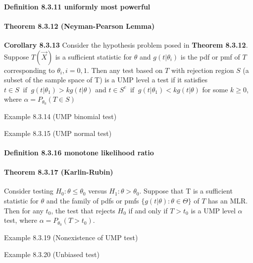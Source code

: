 \documentclass[6pt,twocolumn,Portrait]{article}
\let\oldparagraph\paragraph
\renewcommand{\paragraph}[1]{\oldparagraph{#1}\mbox{}}
\begin{document}
\hypertarget{UMP}{%
\paragraph{\texorpdfstring{\textbf{Definition 8.3.11 uniformly most
powerful}}{Definition 8.3.11 uniformly most powerful}}\label{UMP}}

\hypertarget{Neym-Pear}{%
\paragraph{\texorpdfstring{\textbf{Theorem 8.3.12 (Neyman-Pearson
Lemma)}}{Theorem 8.3.12 (Neyman-Pearson Lemma)}}\label{Neym-Pear}}

\textbf{Corollary 8.3.13} Consider the hypothesis problem posed in
\textbf{Theorem 8.3.12}. Suppose \(T(\vec X)\) is a sufficient statistic
for \(\theta\) and \(g(t|\theta_i)\) is the pdf or pmf of \(T\)
corresponding to \(\theta_i,i=0,1\). Then any test based on \(T\) with
rejection region \(S\) (a subset of the sample space of T) is a UMP
level a test if it satisfies
\(t\in S\ \text{ if }\ g(t|\theta_1)>kg(t|\theta)\) and
\(t\in S^c\ \text{ if }\ g(t|\theta_1)<kg(t|\theta)\) for some
\(k\ge 0\), where \(\alpha=P_{\theta_0}(T\in S)\)

Example 8.3.14 (UMP binomial test)

Example 8.3.15 (UMP normal test)

\hypertarget{MLR}{%
\paragraph{Definition 8.3.16 monotone likelihood ratio}\label{MLR}}

\hypertarget{Kar-Rub}{%
\paragraph{\texorpdfstring{\textbf{Theorem 8.3.17
(Karlin-Rubin)}}{Theorem 8.3.17 (Karlin-Rubin)}}\label{Kar-Rub}}

Consider testing \(H_0:\theta\le\theta_0\) versus
\(H_1:\theta>\theta_0\). Suppose that T is a sufficient statistic for
\(\theta\) and the family of pdfs or pmfs
\(\{g(t|\theta):\theta\in\Theta\}\) of \(T\) has an MLR. Then for any
\(t_0\), the test that rejects \(H_0\) if and only if \(T>t_0\) is a UMP
level \(\alpha\) test, where \(\alpha= P_{\theta_0}(T>t_0)\).

Example 8.3.19 (Nonexistence of UMP test)

Example 8.3.20 (Unbiased test)
\end{document}
